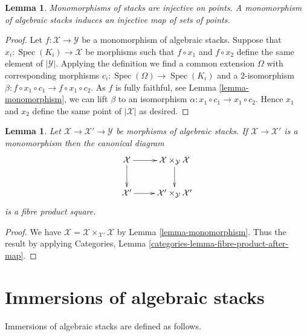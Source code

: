 \documentclass{stacks-project}
\newenvironment{slogan}{\comment}{\endcomment}
\theoremstyle{plain}
\newtheorem{lemma}[subsection]{Lemma}
\theoremstyle{definition}
\theoremstyle{remark}
\numberwithin{equation}{subsection}
\def\Spec{\mathop{\mathrm{Spec}}}
\begin{document}
\begin{lemma}
\label{lemma-monomorphism-injective-points}
\begin{slogan}
Monomorphisms of stacks are injective on points.
\end{slogan}
A monomorphism of algebraic stacks induces an injective map of
sets of points.
\end{lemma}

\begin{proof}
Let $f : \mathcal{X} \to \mathcal{Y}$ be a monomorphism of algebraic stacks.
Suppose that $x_i : \Spec(K_i) \to \mathcal{X}$ be morphisms such that
$f \circ x_1$ and $f \circ x_2$ define the same element of $|\mathcal{Y}|$.
Applying the definition we find a common extension $\Omega$ with corresponding
morphisms $c_i : \Spec(\Omega) \to \Spec(K_i)$ and a
$2$-isomorphism $\beta : f \circ x_1 \circ c_1 \to f \circ x_1 \circ c_2$.
As $f$ is fully faithful, see
Lemma \ref{lemma-monomorphism},
we can lift $\beta$ to an isomorphism
$\alpha : x_1 \circ c_1 \to x_1 \circ c_2$.
Hence $x_1$ and $x_2$ define the same point of $|\mathcal{X}|$
as desired.
\end{proof}

\begin{lemma}
\label{lemma-monomorphism-diagonal}
Let $\mathcal{X} \to \mathcal{X}' \to \mathcal{Y}$ be morphisms
of algebraic stacks. If $\mathcal{X} \to \mathcal{X}'$ is a monomorphism
then the canonical diagram
$$
\xymatrix{
\mathcal{X} \ar[r] \ar[d] &
\mathcal{X} \times_\mathcal{Y} \mathcal{X} \ar[d] \\
\mathcal{X}' \ar[r] &
\mathcal{X}' \times_\mathcal{Y} \mathcal{X}'
}
$$
is a fibre product square.
\end{lemma}

\begin{proof}
We have $\mathcal{X} = \mathcal{X} \times_{\mathcal{X}'} \mathcal{X}$
by Lemma \ref{lemma-monomorphism}. Thus the result by applying
Categories, Lemma \ref{categories-lemma-fibre-product-after-map}.
\end{proof}







\section{Immersions of algebraic stacks}
\label{section-immersions}

\noindent
Immersions of algebraic stacks are defined as follows.
\end{document}
